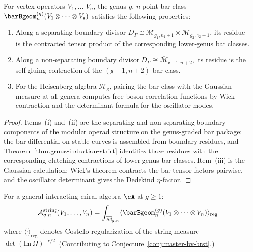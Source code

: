 \begin{theorem}
\label{thm:bar-string-integrand}
For vertex operators $V_1,\ldots,V_n$, the genus-$g$, $n$-point bar
class
$\barBgeom^{(g)}_n(V_1 \otimes \cdots \otimes V_n)$
satisfies the following properties:
\begin{enumerate}[label=\textup{(\roman*)}]
\item Along a separating boundary divisor
 $D_\Gamma \cong \overline{\mathcal{M}}_{g_1,n_1+1}
 \times \overline{\mathcal{M}}_{g_2,n_2+1}$, its residue is the
 contracted tensor product of the corresponding lower-genus bar
 classes.
\item Along a non-separating boundary divisor
 $D_\Gamma \cong \overline{\mathcal{M}}_{g-1,n+2}$, its residue is
 the self-gluing contraction of the $(g-1,n+2)$ bar class.
\item For the Heisenberg algebra $\mathcal{H}_\kappa$, pairing the bar
 class with the Gaussian measure at all genera computes free boson
 correlation functions by Wick contraction and the determinant formula
 for the oscillator modes.
\end{enumerate}
\end{theorem}

\begin{proof}
Items~(i) and~(ii) are the separating and non-separating boundary
components of the modular operad structure on the genus-graded bar
package: the bar differential on stable curves is assembled from
boundary residues, and Theorem~\ref{thm:genus-induction-strict}
identifies those residues with the corresponding clutching
contractions of lower-genus bar classes. Item~(iii) is the Gaussian
calculation: Wick's theorem contracts the bar tensor factors pairwise,
and the oscillator determinant gives the Dedekind $\eta$-factor.
\end{proof}

\begin{conjecture}\label{conj:string-amplitude}
For a general interacting chiral algebra $\cA$ at
$g \geq 1$:
\[
\mathcal{A}_{g,n}^{\mathrm{string}}(V_1, \ldots, V_n)
= \int_{\overline{\mathcal{M}}_{g,n}}
\langle \barBgeom^{(g)}_n
(V_1 \otimes \cdots \otimes V_n)
\rangle_{\mathrm{reg}}
\]
where $\langle \cdot \rangle_{\mathrm{reg}}$ denotes
Costello regularization of the string measure
$\det(\mathrm{Im}\,\Omega)^{-c/2}$.
(Contributing to Conjecture~\ref{conj:master-bv-brst}.)
\end{conjecture}


